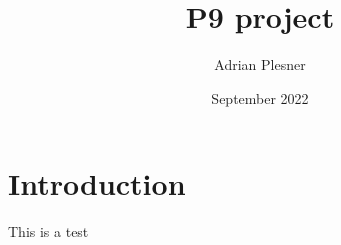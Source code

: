 \documentclass{article}
\title{P9 project}
\author{Adrian Plesner}
\date{September 2022}
\begin{document}
\maketitle

\section{Introduction}
This is a test
\end{document}
